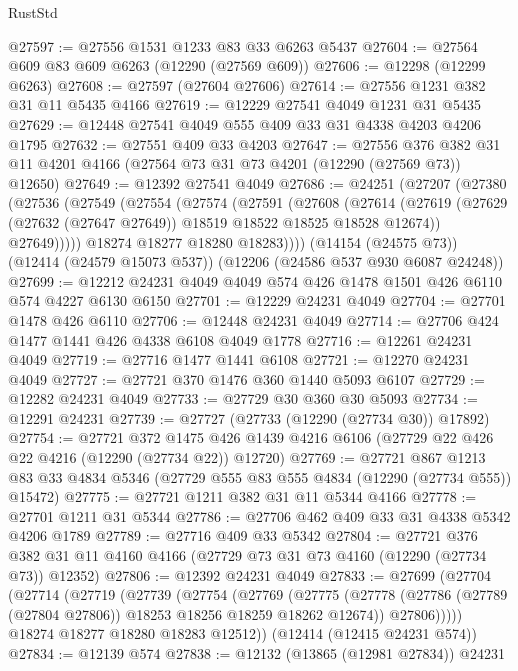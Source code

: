 \begin{lexlean}{RustStd}
\begin{coremodule}
{\begin{coremodule}
{{{{{{{{{{{{{{{{{{{{{{{{{{{{{{{{{{{{{{{{{{{{{{{{{{@27597 := @27556 @1531 @1233 @83 @33 @6263 @5437
@27604 := @27564 @609 @83 @609 @6263 (@12290 (@27569 @609))
@27606 := @12298 (@12299 @6263)
@27608 := @27597 (@27604 @27606)
@27614 := @27556 @1231 @382 @31 @11 @5435 @4166
@27619 := @12229 @27541 @4049 @1231 @31 @5435
@27629 := @12448 @27541 @4049 @555 @409 @33 @31 @4338 @4203 @4206 @1795
@27632 := @27551 @409 @33 @4203
@27647 := @27556
    @376
    @382
    @31
    @11
    @4201
    @4166
    (@27564 @73 @31 @73 @4201 (@12290 (@27569 @73)) @12650)
@27649 := @12392 @27541 @4049
@27686 := @24251
    (@27207
      (@27380
        (@27536
          (@27549
            (@27554
              (@27574
                (@27591
                  (@27608
                    (@27614
                      (@27619 (@27629 (@27632 (@27647 @27649)) @18519 @18522 @18525 @18528 @12674))
                      @27649)))))
            @18274
            @18277
            @18280
            @18283))))
    (@14154 (@24575 @73))
    (@12414 (@24579 @15073 @537))
    (@12206 (@24586 @537 @930 @6087 @24248))
@27699 := @12212 @24231 @4049 @4049 @574 @426 @1478 @1501 @426 @6110 @574 @4227 @6130 @6150
@27701 := @12229 @24231 @4049
@27704 := @27701 @1478 @426 @6110
@27706 := @12448 @24231 @4049
@27714 := @27706 @424 @1477 @1441 @426 @4338 @6108 @4049 @1778
@27716 := @12261 @24231 @4049
@27719 := @27716 @1477 @1441 @6108
@27721 := @12270 @24231 @4049
@27727 := @27721 @370 @1476 @360 @1440 @5093 @6107
@27729 := @12282 @24231 @4049
@27733 := @27729 @30 @360 @30 @5093
@27734 := @12291 @24231
@27739 := @27727 (@27733 (@12290 (@27734 @30)) @17892)
@27754 := @27721
    @372
    @1475
    @426
    @1439
    @4216
    @6106
    (@27729 @22 @426 @22 @4216 (@12290 (@27734 @22)) @12720)
@27769 := @27721
    @867
    @1213
    @83
    @33
    @4834
    @5346
    (@27729 @555 @83 @555 @4834 (@12290 (@27734 @555)) @15472)
@27775 := @27721 @1211 @382 @31 @11 @5344 @4166
@27778 := @27701 @1211 @31 @5344
@27786 := @27706 @462 @409 @33 @31 @4338 @5342 @4206 @1789
@27789 := @27716 @409 @33 @5342
@27804 := @27721
    @376
    @382
    @31
    @11
    @4160
    @4166
    (@27729 @73 @31 @73 @4160 (@12290 (@27734 @73)) @12352)
@27806 := @12392 @24231 @4049
@27833 := @27699
    (@27704
      (@27714
        (@27719
          (@27739
            (@27754
              (@27769
                (@27775
                  (@27778 (@27786 (@27789 (@27804 @27806)) @18253 @18256 @18259 @18262 @12674))
                  @27806)))))
        @18274
        @18277
        @18280
        @18283
        @12512))
    (@12414 (@12415 @24231 @574))
@27834 := @12139 @574
@27838 := @12132 (@13865 (@12981 @27834)) @24231
}}}}}}}}}}}}}}}}}}}}}}}}}}}}}}}}}}}}}}}}}}}}}}}}}}
\end{coremodule}}
\end{coremodule}
\end{lexlean}
